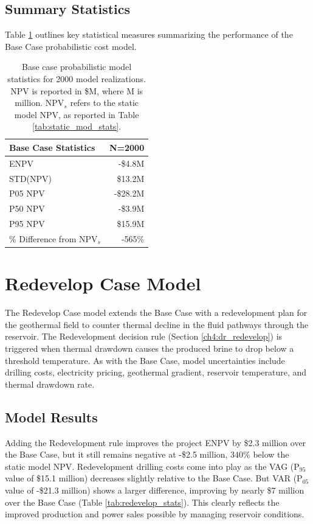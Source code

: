 \subsection{Summary Statistics}\label{ch6:base_stats}
Table \ref{tab:base_stats} outlines key statistical measures summarizing the performance of the Base Case probabilistic cost model.
\begin{table}[H]
\centering
\begin{tabular}{|l|r|}
\hline
\textbf{Base Case Statistics} & N=2000 \\ \hline
ENPV & -\$4.8M \\ \hline
STD(NPV) & \$13.2M \\ \hline
P05 NPV & -\$28.2M \\ \hline
P50 NPV & -\$3.9M \\ \hline
P95 NPV & \$15.9M \\ \hline
\% Difference from NPV$_{s}$ & -565\% \\ \hline
\end{tabular}
\caption[Probabilistic Base Case statistics]{Base case probabilistic model statistics for 2000 model realizations. NPV is reported in \$M, where M is million. NPV$_s$ refers to the static model NPV, as reported in Table \ref{tab:static_mod_stats}.}
\label{tab:base_stats}
\end{table}
\vfill
\pagebreak
\section{Redevelop Case Model}
\label{ch6:redevelop_case}

The Redevelop Case model extends the Base Case with a redevelopment plan for the geothermal field to counter thermal decline in the fluid pathways through the reservoir. The Redevelopment decision rule (Section \ref{ch4:dr_redevelop}) is triggered when thermal drawdown causes the produced brine to drop below a threshold temperature. As with the Base Case, model uncertainties include drilling costs, electricity pricing, geothermal gradient, reservoir temperature, and thermal drawdown rate.

\subsection{Model Results}\label{ch6:redevelop_results}
Adding the Redevelopment rule improves the project ENPV by \$2.3 million over the Base Case, but it still remains negative at -\$2.5 million, 340\% below the static model NPV. Redevelopment drilling costs come into play as the VAG (P$_{95}$ value of \$15.1 million) decreases slightly relative to the Base Case. But VAR (P$_{05}$ value of -\$21.3 million) shows a larger difference, improving by nearly \$7 million over the Base Case (Table \ref{tab:redevelop_stats}). This clearly reflects the improved production and power sales possible by managing reservoir conditions.

